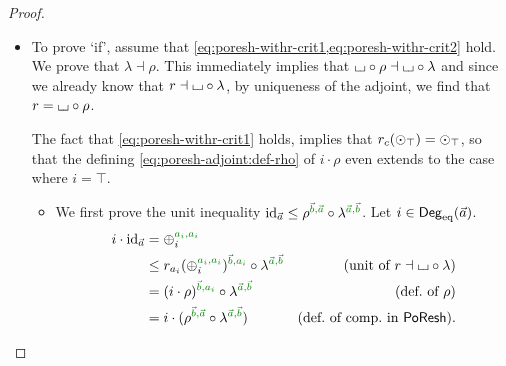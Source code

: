 \documentclass[a4paper]{memoir}
\begin{document}
\begin{proof}
\begin{enumerate}
\begin{itemize}
			We tie our findings together:
			\[
				\getdeg(\mixpol_i \circ \rho) = \getdeg(i \cdot \rho) > j = \getdeg(\mixpol_j) \geq \getdeg(r_\ypolar(\mixpol_i))
			\]
			so that $r$ cannot be the action of $\rho$.
			
			\item To prove `if', assume that \cref{eq:poresh-withr-crit1,eq:poresh-withr-crit2} hold.
			We prove that $\lambda \dashv \rho$. This immediately implies that ${\llcorner\hspace{-.4ex}\lrcorner} \circ \rho \dashv {\llcorner\hspace{-.4ex}\lrcorner} \circ \lambda$ and since we already know that $r \dashv {\llcorner\hspace{-.4ex}\lrcorner} \circ \lambda$, by uniqueness of the adjoint, we find that $r = {\llcorner\hspace{-.4ex}\lrcorner} \circ \rho$.
			
			The fact that \cref{eq:poresh-withr-crit1} holds, implies that $r_c({\odot}_\top) = {\odot}_\top$, so that the defining \cref{eq:poresh-adjoint:def-rho} of $i \cdot \rho$ even extends to the case where $i = \top$.
			\begin{itemize}
				\item We first prove the unit inequality $\id_{\vec a} \leq \rho \pmrhom{\vec b}{\vec a} \circ \lambda \pmrhom{\vec a}{\vec b}$.
				Let $i \in {\mathsf{Deg}_{\mathrm{eq}}}(\vec a)$.
				\begin{align*}
					i \cdot \id_{\vec a}
					&= \pospol_i \pmrhom{a_i}{a_i} \\
					&\leq r_{a_i}(\pospol_i \pmrhom{a_i}{a_i})\pmrhom{\vec b}{a_i} \circ \lambda \pmrhom{\vec a}{\vec b}
					& \text{(unit of $r \dashv \loch \circ \lambda$)} \\
					&= (i \cdot \rho)\pmrhom{\vec b}{a_i} \circ \lambda \pmrhom{\vec a}{\vec b}
					& \text{(def.\ of $\rho$)} \\
					&= i \cdot (\rho \pmrhom{\vec b}{\vec a} \circ \lambda \pmrhom{\vec a}{\vec b})
					& \text{(def.\ of comp.\ in $\poreshcat$).}
				\end{align*}
				

\end{itemize}
\end{itemize}
\end{enumerate}
\end{proof}
\end{document}
